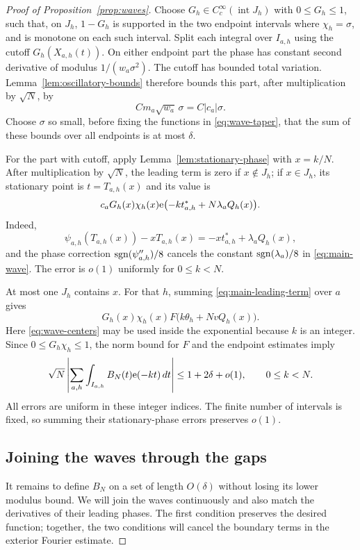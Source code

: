 \begin{proof}[Proof of Proposition~\ref{prop:waves}]
Choose $G_h\in C_c^\infty(\operatorname{int}J_h)$ with $0\le G_h\le1$,
such that, on $J_h$, $1-G_h$ is supported in the two endpoint intervals where
$\chi_h=\sigma$, and is monotone on each such interval.
Split each integral over $I_{a,h}$ using the cutoff
$G_h(X_{a,h}(t))$.  On either endpoint part the phase has constant second
derivative of modulus $1/(w_a\sigma^2)$.  The cutoff has bounded total
variation.  Lemma~\ref{lem:oscillatory-bounds} therefore bounds this part,
after multiplication by $\sqrt N$, by
\[
 C m_a\sqrt{w_a}\,\sigma=C|c_a|\sigma.
\]
Choose $\sigma$ so small, before fixing the functions in
\eqref{eq:wave-taper}, that the sum of these bounds over all endpoints is
at most $\delta$.

For the part with cutoff, apply Lemma~\ref{lem:stationary-phase} with
$x=k/N$.  After multiplication by $\sqrt N$, the leading term is zero
if $x\notin J_h$; if $x\in J_h$, its stationary point is
$t=T_{a,h}(x)$ and its value is
\begin{equation}\label{eq:main-leading-term}
 c_aG_h(x)\chi_h(x)
 \mathrm e\bigl(-kt^*_{a,h}+N\lambda_aQ_h(x)\bigr).
\end{equation}
Indeed,
\[
 \psi_{a,h}(T_{a,h}(x))-xT_{a,h}(x)
   =-xt^*_{a,h}+\lambda_aQ_h(x),
\]
and the phase correction $\operatorname{sgn}(\psi_{a,h}'')/8$ cancels the constant
$\operatorname{sgn}(\lambda_a)/8$ in \eqref{eq:main-wave}.
The error is $o(1)$ uniformly for $0\le k<N$.

At most one $J_h$ contains $x$.  For that $h$, summing
\eqref{eq:main-leading-term} over $a$ gives
\[
 G_h(x)\chi_h(x)F\bigl(k\theta_h+NvQ_h(x)\bigr).
\]
Here \eqref{eq:wave-centers} may be used inside the exponential because
$k$ is an integer.  Since $0\le G_h\chi_h\le1$, the norm bound for $F$
and the endpoint estimates imply
\begin{equation}\label{eq:main-fourier-bound}
 \sqrt N\left|\sum_{a,h}\int_{I_{a,h}}B_N(t)\mathrm e(-kt)\,dt\right|
 \le1+2\delta+o(1),\qquad 0\le k<N.
\end{equation}
All errors are uniform in these integer indices.  The finite number of
intervals is fixed, so summing their stationary-phase errors preserves
$o(1)$.

\subsection*{Joining the waves through the gaps}

It remains to define $B_N$ on a set of length $O(\delta)$ without losing
its lower modulus bound.  We will join the waves continuously and also
match the derivatives of their leading phases.  The first condition
preserves the desired function; together, the two conditions will cancel
the boundary terms in the exterior Fourier estimate.


\end{proof}
